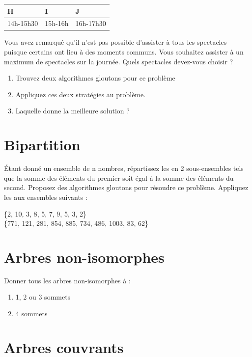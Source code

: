 \documentclass{article}[12pt]
\begin{document}
\begin{table}[h!]
\centering
\begin{tabular}{l|l|l|}
\hline
\textbf{H} & \textbf{I} & \textbf{J} \\ \hline
14h-15h30  & 15h-16h    & 16h-17h30  \\ \hline
\end{tabular}
\end{table}

Vous avez remarqué qu'il n'est pas possible d'assister à tous les spectacles puisque certains ont lieu à des moments communs. Vous souhaitez assister à un maximum de spectacles sur la journée. Quels spectacles devez-vous choisir ?

    \begin{enumerate}
        \item Trouvez deux algorithmes gloutons pour ce problème
        \item Appliquez ces deux stratégies au problème.
        \item Laquelle donne la meilleure solution ?
    \end{enumerate}
    
\section*{Bipartition}
Étant donné un ensemble de n nombres, répartissez les en 2 sous-ensembles tels que la somme des éléments du premier soit égal à la somme des éléments du second. Proposez des algorithmes gloutons pour résoudre ce problème. Appliquez les aux ensembles suivants :
\begin{center}
   \{2, 10, 3, 8, 5, 7, 9, 5, 3, 2\}\\
\{771, 121, 281, 854, 885, 734, 486, 1003, 83, 62\} 
\end{center}

\section*{Arbres non-isomorphes}
Donner tous les arbres non-isomorphes à :
\begin{enumerate}
    \item 1, 2 ou 3 sommets
    \item 4 sommets
\end{enumerate}

\section*{Arbres couvrants}
\end{document}
